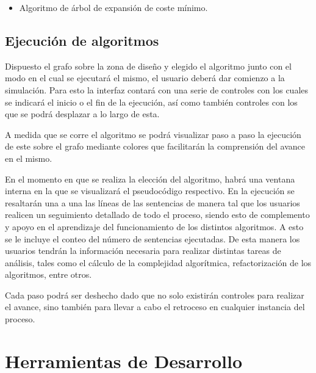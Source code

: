 \documentclass{book}
\begin{document}
	\begin{itemize}
		\renewcommand{\labelitemi}{\scriptsize\tiny$\blacksquare$} 
		\itemsep=2pt \topsep=0pt \partopsep=0pt \parskip=0pt \parsep=0pt
		
		\item Algoritmo de árbol de expansión de coste mínimo.

	\end{itemize}
	\medskip



\section{Ejecución de algoritmos}

Dispuesto el grafo sobre la zona de diseño y elegido el algoritmo junto con el modo en el cual se ejecutará el mismo, el usuario deberá dar comienzo a la simulación. Para esto la interfaz contará con una serie de controles con los cuales se indicará el inicio o el fin de la ejecución, así como también controles con los que se podrá desplazar a lo largo de esta.
\par
A medida que se corre el algoritmo se podrá visualizar paso a paso la ejecución de este sobre el grafo mediante colores que facilitarán la comprensión del avance en el mismo.
\par
En el momento en que se realiza la elección del algoritmo, habrá una ventana interna en la que se visualizará el pseudocódigo respectivo. En la ejecución se resaltarán una a una las líneas de las sentencias de manera tal que los usuarios realicen un seguimiento detallado de todo el proceso, siendo esto de complemento y apoyo en el aprendizaje del funcionamiento de los distintos algoritmos. A esto se le incluye el conteo del número de sentencias ejecutadas. De esta manera los usuarios tendrán la información necesaria para realizar distintas tareas de análisis, tales como el cálculo de la complejidad algorítmica, refactorización de los algoritmos, entre otros.
\par
Cada paso podrá ser deshecho dado que no solo existirán controles para realizar el avance, sino también para llevar a cabo el retroceso en cualquier instancia del proceso.



%
%
\chapter{Herramientas de Desarrollo}
\end{document}
